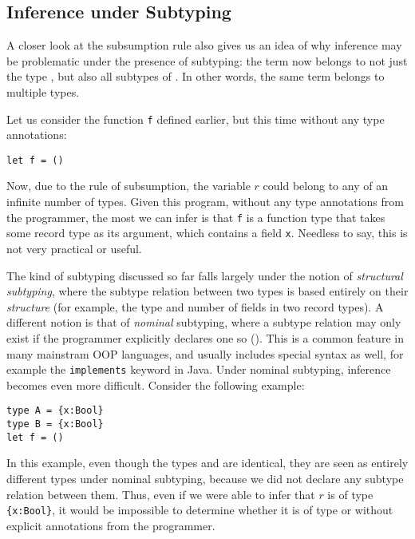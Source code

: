 \subsection{Inference under Subtyping}

A closer look at the subsumption rule also gives us an idea of why inference may be problematic under the presence of subtyping: the term  now belongs to not just the type , but also all subtypes of . In other words, the same term belongs to multiple types.

Let us consider the function \texttt{f} defined earlier, but this time without any type annotations:
\begin{center}
\texttt{let f = ()}
\end{center}
Now, due to the rule of subsumption, the variable $r$ could belong to any of an infinite number of types. Given this program, without any type annotations from the programmer, the most we can infer is that \texttt{f} is a function type that takes some record type as its argument, which contains a field \texttt{x}. Needless to say, this is not very practical or useful.

The kind of subtyping discussed so far falls largely under the notion of \textit{structural subtyping}, where the subtype relation between two types is based entirely on their \textit{structure} (for example, the type and number of fields in two record types). A different notion is that of \textit{nominal} subtyping, where a subtype relation may only exist if the programmer explicitly declares one so (\cite{pierce}). This is a common feature in many mainstram OOP languages, and usually includes special syntax as well, for example the \texttt{implements} keyword in Java. Under nominal subtyping, inference becomes even more difficult. Consider the following example:
\begin{center}
\texttt{type A = \{x:Bool\}} \\
\texttt{type B = \{x:Bool\}} \\
\texttt{let f = ()}
\end{center}
In this example, even though the types  and  are identical, they are seen as entirely different types under nominal subtyping, because we did not declare any subtype relation between them. Thus, even if we were able to infer that $r$ is of type \texttt{\{x:Bool\}}, it would be impossible to determine whether it is of type  or  without explicit annotations from the programmer.
